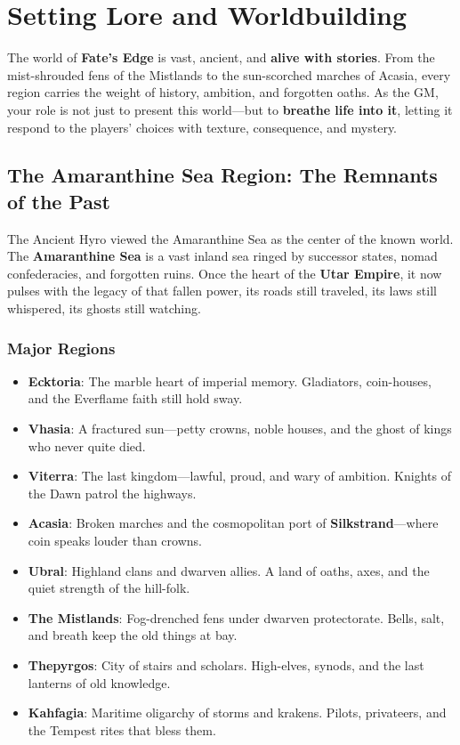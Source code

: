 \chapter{Setting Lore and Worldbuilding}

The world of \textbf{Fate's Edge} is vast, ancient, and \textbf{alive with stories}. From the mist-shrouded fens of the Mistlands to the sun-scorched marches of Acasia, every region carries the weight of history, ambition, and forgotten oaths. As the GM, your role is not just to present this world---but to \textbf{breathe life into it}, letting it respond to the players' choices with texture, consequence, and mystery.

\section*{The Amaranthine Sea Region: The Remnants of the Past}

The Ancient Hyro viewed the Amaranthine Sea as the center of the known world. The \textbf{Amaranthine Sea} is a vast inland sea ringed by successor states, nomad confederacies, and forgotten ruins. Once the heart of the \textbf{Utar Empire}, it now pulses with the legacy of that fallen power, its roads still traveled, its laws still whispered, its ghosts still watching.

\subsection*{Major Regions}

\begin{itemize}
    \item \textbf{Ecktoria}: The marble heart of imperial memory. Gladiators, coin-houses, and the Everflame faith still hold sway.
    \item \textbf{Vhasia}: A fractured sun---petty crowns, noble houses, and the ghost of kings who never quite died.
    \item \textbf{Viterra}: The last kingdom---lawful, proud, and wary of ambition. Knights of the Dawn patrol the highways.
    \item \textbf{Acasia}: Broken marches and the cosmopolitan port of \textbf{Silkstrand}---where coin speaks louder than crowns.
    \item \textbf{Ubral}: Highland clans and dwarven allies. A land of oaths, axes, and the quiet strength of the hill-folk.
    \item \textbf{The Mistlands}: Fog-drenched fens under dwarven protectorate. Bells, salt, and breath keep the old things at bay.
    \item \textbf{Thepyrgos}: City of stairs and scholars. High-elves, synods, and the last lanterns of old knowledge.
    \item \textbf{Kahfagia}: Maritime oligarchy of storms and krakens. Pilots, privateers, and the Tempest rites that bless them.
\end{itemize}

